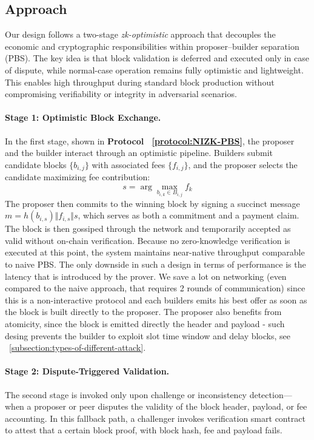 \documentclass[11pt]{article}
\begin{document}
\subsection{Approach}
\label{sec:approach}

Our design follows a two-stage \textit{zk-optimistic} approach that decouples the economic and cryptographic responsibilities within proposer–builder separation (PBS). The key idea is that block validation is deferred and executed only in case of dispute, while normal-case operation remains fully optimistic and lightweight. This enables high throughput during standard block production without compromising verifiability or integrity in adversarial scenarios.



\paragraph{Stage 1: Optimistic Block Exchange.}
In the first stage, shown in \textbf{Protocol ~\ref{protocol:NIZK-PBS}}, the proposer and the builder interact through an optimistic pipeline. Builders submit candidate blocks $\{b_{i,j}\}$ with associated fees $\{f_{i,j}\}$, and the proposer selects the candidate maximizing fee contribution:
\[
s = \arg\max_{b_{i,k} \in B_{i,j}} f_k
\]
The proposer then commits to the winning block by signing a succinct message
$m = h(b_{i,s}) \Vert f_{i,s} \Vert s$,
which serves as both a commitment and a payment claim. The block is then gossiped through the network and temporarily accepted as valid without on-chain verification. Because no zero-knowledge verification is executed at this point, the system maintains near-native throughput comparable to naive PBS. The only downside in such a design in terms of performance is the latency that is introduced by the prover. We save a lot on networking (even compared to the naive approach, that requires 2 rounds of communication) since this is a non-interactive protocol and each builders emits his best offer as soon as the block is built directly to the proposer. The proposer also benefits from atomicity, since the block is emitted directly the header and payload - such desing prevents the builder to exploit slot time window and delay blocks, see ~\ref{subsection:types-of-different-attack}.

\paragraph{Stage 2: Dispute-Triggered Validation.}
The second stage is invoked only upon challenge or inconsistency detection—when a proposer or peer disputes the validity of the block header, payload, or fee accounting. In this fallback path, a challenger invokes verification smart contract to attest that a certain block proof, with block hash, fee and payload fails.
\end{document}
